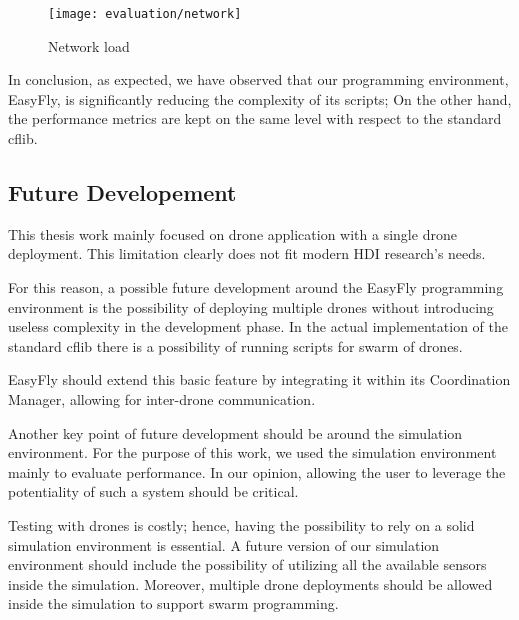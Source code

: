 \begin{figure}[t]
    \centering
    \texttt{[image: evaluation/network]}
    \caption{Network load}\label{fig:network_load}
\end{figure}

In conclusion, as expected, we have observed that our programming environment, EasyFly, is significantly reducing the complexity of its scripts; 
On the other hand, the performance metrics are kept on the same level with respect to the standard cflib.

\subsection{Future Developement}\label{subsec:future_developement}
This thesis work mainly focused on drone application with a single drone deployment. 
This limitation clearly does not fit modern HDI research's needs. 

For this reason, a possible future development around the EasyFly programming environment is the possibility of deploying multiple drones without introducing useless complexity in the development phase.
In the actual implementation of the standard cflib there is a possibility of running scripts for swarm of drones.

EasyFly should extend this basic feature by integrating it within its Coordination Manager, allowing for inter-drone communication.

Another key point of future development should be around the simulation environment. 
For the purpose of this work, we used the simulation environment mainly to evaluate performance.
In our opinion, allowing the user to leverage the potentiality of such a system should be critical.

Testing with drones is costly; hence, having the possibility to rely on a solid simulation environment is essential.
A future version of our simulation environment should include the possibility of utilizing all the available sensors inside the simulation. 
Moreover, multiple drone deployments should be allowed inside the simulation to support swarm programming.